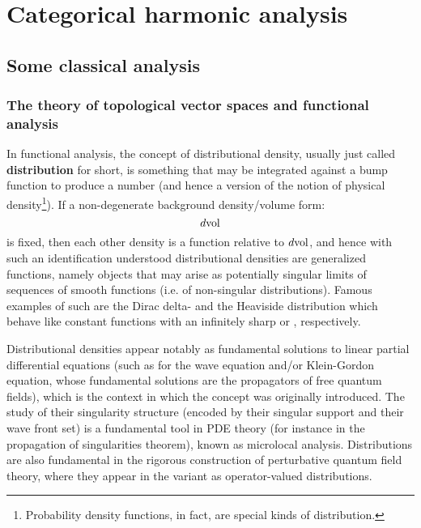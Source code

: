 \chapter{Categorical harmonic analysis}
    \begin{abstract}
        
    \end{abstract}
    
    \minitoc
    
    \section{Some classical analysis}
        \subsection{The theory of topological vector spaces and functional analysis}
            In functional analysis, the concept of distributional density, usually just called \textbf{distribution} for short, is something that may be integrated against a bump function to produce a number (and hence a  version of the notion of physical density\footnote{Probability density functions, in fact, are special kinds of distribution.}). If a non-degenerate background density/volume form:
                $$d\mathrm{vol}$$
            is fixed, then each other density is a function relative to $d\mathrm{vol}$, and hence with such an identification understood distributional densities are generalized functions, namely objects that may arise as potentially singular limits of sequences of smooth functions (i.e. of non-singular distributions). Famous examples of such are the Dirac delta- and the Heaviside distribution which behave like constant functions with an infinitely sharp  or , respectively.

            Distributional densities appear notably as fundamental solutions to linear partial differential equations (such as for the wave equation and/or Klein-Gordon equation, whose fundamental solutions are the propagators of free quantum fields), which is the context in which the concept was originally introduced. The study of their singularity structure (encoded by their singular support and their wave front set) is a fundamental tool in PDE theory (for instance in the propagation of singularities theorem), known as microlocal analysis. Distributions are also fundamental in the rigorous construction of perturbative quantum field theory, where they appear in the variant as operator-valued distributions.
            
